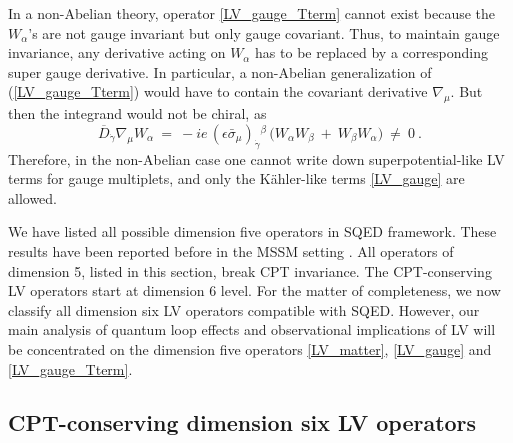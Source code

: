 \documentclass[12pt]{revtex4}
\begin{document}
In a non-Abelian theory, operator \eqref{LV_gauge_Tterm} cannot exist
because the $W_\alpha$'s are not gauge invariant but only gauge covariant.
Thus, to maintain gauge invariance, any derivative acting on 
$ W_\alpha $ has to
be replaced by a corresponding super gauge derivative. 
In particular, a non-Abelian generalization of 
 (\ref{LV_gauge_Tterm}) would have to contain the covariant
derivative $\nabla_\mu$.  
But then the integrand would not be chiral, as 
%
\begin{equation}
\overline{D}_{\dot\gamma} \nabla_\mu W_\alpha ~=~ 
-i e\, (\epsilon \bar\sigma_\mu)_{\dot\gamma}{}^\beta\, 
\Big( W_\alpha W_\beta ~+~ W_\beta W_\alpha \Big) ~\neq~ 0~. 
\end{equation} 
%
Therefore, in the non-Abelian case one cannot write down
superpotential-like LV terms for gauge multiplets, and only 
the K\"ahler-like terms \eqref{LV_gauge} are allowed. 

We have listed all possible dimension five operators in SQED
framework. These results have been reported before in the MSSM setting
\cite{GrootNibbelink:2004za}. 
All operators of dimension 5, listed in this section, break CPT invariance. 
The CPT-conserving LV operators start at dimension 6 level. 
For the matter of completeness, we now classify all dimension 
six LV operators compatible with SQED. 
However, our main analysis of quantum loop effects and observational 
implications of LV will be concentrated on the dimension five
operators \eqref{LV_matter}, \eqref{LV_gauge} and \eqref{LV_gauge_Tterm}.


\subsection{CPT-conserving dimension six LV operators}
\label{Dim6}
\end{document}
